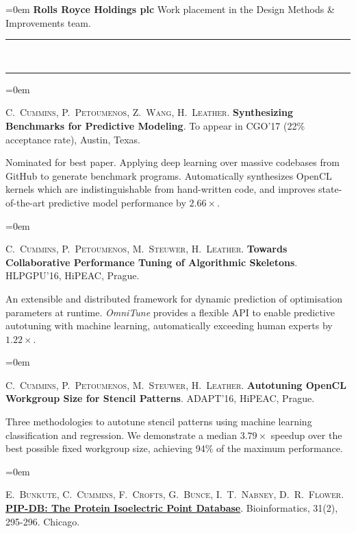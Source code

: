 \documentclass[a4paper,11pt,hidelinks]{scrartcl}
\newcommand{\MarginText}[1]{\marginpar{\raggedleft\itshape\normalsize#1}}
\newcommand{\Title}[1]{\noindent\rule{15cm}{0.4pt}\vspace{-.45em}\\
\noindent\spacedlowsmallcaps{\color{titlecolour}{#1}}

\vspace{-.85em}\noindent\rule{15cm}{0.4pt}\vspace{.2em}}
\newcommand{\Description}[1]{\hangindent=0em\hangafter=0%
\noindent\normalsize{#1}\vspace{1em}}
\newcommand{\Publication}[5]{\Description{\MarginText{#1}#2. \textbf{\href{#5}{#3}}. #4.}}
\begin{document}
\begin{cv}
\Description{\MarginText{2008}\textbf{Rolls Royce Holdings plc}
  \newline Work placement in the Design Methods \& Improvements team.%
}

\newpage

\Title{Publications}

\Description{\MarginText{2017}C.\ \textsc{Cummins}, P.\
  \textsc{Petoumenos}, Z.\ \textsc{Wang}, H.\
  \textsc{Leather}. \textbf{Synthesizing Benchmarks for Predictive Modeling}. To appear in CGO'17 (22\% acceptance rate), Austin, Texas.\@
  \newline\vspace{-.8em}

  \noindent %
  Nominated for best paper. Applying deep learning over massive codebases from GitHub to generate benchmark programs. Automatically synthesizes OpenCL kernels which are indistinguishable from hand-written code, and improves state-of-the-art predictive model performance by $2.66\times$.%
}

\Description{\MarginText{2016}C.\ \textsc{Cummins}, P.\
  \textsc{Petoumenos}, M.\ \textsc{Steuwer}, H.\
  \textsc{Leather}. \textbf{Towards Collaborative Performance Tuning
    of Algorithmic Skeletons}. HLPGPU'16, HiPEAC, Prague.\@
  \newline\vspace{-.8em}

  \noindent %
  An extensible and distributed framework for dynamic prediction of optimisation parameters at runtime. \emph{OmniTune} provides a flexible API to enable predictive autotuning with machine learning, automatically exceeding human experts by $1.22\times$.%
}

\Description{\MarginText{2016}C.\ \textsc{Cummins}, P.\
  \textsc{Petoumenos}, M.\ \textsc{Steuwer}, H.\
  \textsc{Leather}. \textbf{Autotuning OpenCL Workgroup Size for
    Stencil Patterns}. ADAPT'16, HiPEAC, Prague.\@ \newline\vspace{-.8em}

  \noindent %
  Three methodologies to autotune stencil patterns using machine learning classification and regression. We demonstrate a median $3.79\times$ speedup over the best possible fixed workgroup size, achieving 94\% of the maximum performance.%
}

\Description{%
  \MarginText{2015}%
  E.\ \textsc{Bunkute}, %
  C.\ \textsc{Cummins}, %
  F.\ \textsc{Crofts}, %
  G.\ \textsc{Bunce}, %
  I.\ T.\ \textsc{Nabney}, %
  D.\ R.\ \textsc{Flower}.
  \textbf{\href{http://bioinformatics.oxfordjournals.org/content/31/2/295.full?etoc}{PIP-DB:
      The Protein Isoelectric Point Database}}.
  Bioinformatics, 31(2), 295-296. Chicago. %
  \newline\vspace{-.8em}

}
\end{cv}
\end{document}
